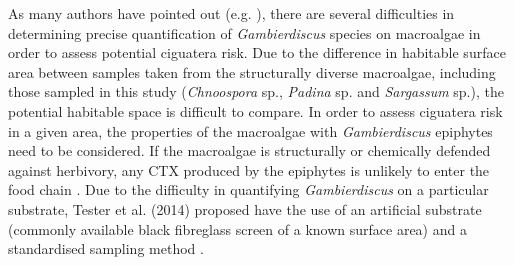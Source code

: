 \documentclass[12pt]{article}
\begin{document}

As many authors have pointed out (e.g. \citep{litaker2010global,bomber1989epiphytism,tester2014sampling,cruz2006macroalgal,parsons2011examination,globalcig,lobel1988assessment}), there are several difficulties in determining precise quantification of \textit{Gambierdiscus} species on macroalgae in order to assess potential ciguatera risk. Due to the difference in habitable surface area between samples taken from the structurally diverse macroalgae, including those sampled in this study (\emph{Chnoospora} sp., \emph{Padina} sp. and \emph{Sargassum} sp.), the potential habitable space is difficult to compare. In order to assess ciguatera risk in a given area, the properties of the macroalgae with \emph{Gambierdiscus} epiphytes need to be considered. If the macroalgae is structurally or chemically defended against herbivory, any CTX produced by the epiphytes is unlikely to enter the food chain \citep{cruz2006macroalgal}. Due to the difficulty in quantifying \emph{Gambierdiscus} on a particular substrate, Tester et al. (2014) proposed have the use of an artificial substrate (commonly available black fibreglass screen of a known surface area) and a standardised sampling method \citep{tester2014sampling}.
\end{document}
